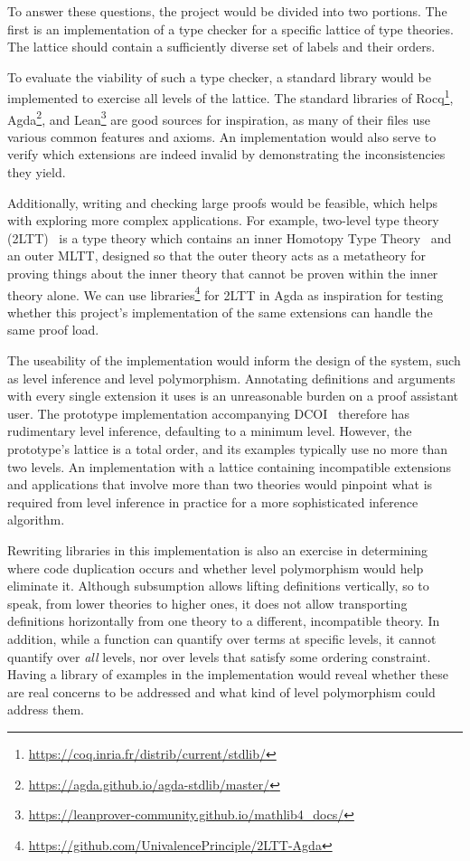\documentclass{article}
\begin{document}
To answer these questions, the project would be divided into two portions.
The first is an implementation of a type checker for a specific lattice of type theories.
The lattice should contain a sufficiently diverse set of labels and their orders.

To evaluate the viability of such a type checker,
a standard library would be implemented to exercise all levels of the lattice.
The standard libraries of Rocq\footnote{\url{https://coq.inria.fr/distrib/current/stdlib/}},
Agda\footnote{\url{https://agda.github.io/agda-stdlib/master/}},
and Lean\footnote{\url{https://leanprover-community.github.io/mathlib4_docs/}}
are good sources for inspiration,
as many of their files use various common features and axioms.
An implementation would also serve to verify which extensions are indeed invalid
by demonstrating the inconsistencies they yield.

Additionally, writing and checking large proofs would be feasible,
which helps with exploring more complex applications.
For example, two-level type theory (2LTT)~\citep{2ls,2ltt}
is a type theory which contains an inner Homotopy Type Theory~\citep{hott} and an outer MLTT,
designed so that the outer theory acts as a metatheory for proving things about the inner theory
that cannot be proven within the inner theory alone.
We can use libraries\footnote{\url{https://github.com/UnivalencePrinciple/2LTT-Agda}}
for 2LTT in Agda as inspiration for testing whether this project's implementation
of the same extensions can handle the same proof load.

The useability of the implementation would inform the design of the system,
such as level inference and level polymorphism.
Annotating definitions and arguments with every single extension it uses
is an unreasonable burden on a proof assistant user.
The prototype implementation accompanying DCOI~\citep{dcoi-artifact}
therefore has rudimentary level inference, defaulting to a minimum level.
However, the prototype's lattice is a total order,
and its examples typically use no more than two levels.
An implementation with a lattice containing incompatible extensions
and applications that involve more than two theories
would pinpoint what is required from level inference in practice
for a more sophisticated inference algorithm.

Rewriting libraries in this implementation is also an exercise
in determining where code duplication occurs
and whether level polymorphism would help eliminate it.
Although subsumption allows lifting definitions vertically,
so to speak, from lower theories to higher ones,
it does not allow transporting definitions horizontally
from one theory to a different, incompatible theory.
In addition, while a function can quantify over terms at specific levels,
it cannot quantify over \emph{all} levels,
nor over levels that satisfy some ordering constraint.
Having a library of examples in the implementation
would reveal whether these are real concerns to be addressed
and what kind of level polymorphism could address them.
\end{document}
